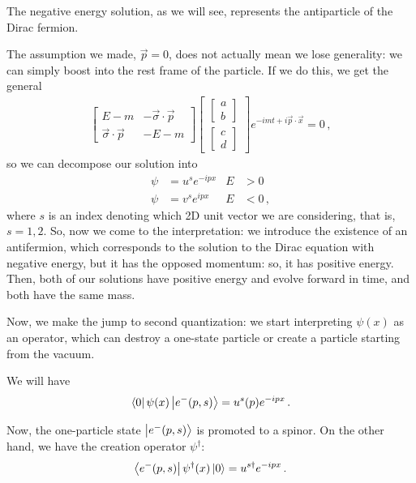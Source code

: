 \documentclass[main.tex]{subfiles}
\begin{document}
The negative energy solution, as we will see, represents the antiparticle of the Dirac fermion.

The assumption we made, \(\vec{p} = 0\), does not actually mean we lose generality: we can simply boost into the rest frame of the particle.
If we do this, we get the general 
%
\begin{subequations}
\begin{align}
\left[\begin{array}{cc}
E-m & - \vec{\sigma} \cdot \vec{p} \\ 
\vec{\sigma} \cdot \vec{p} & -E-m
\end{array}\right]
\left[\begin{array}{c}
\left[\begin{array}{c}
a \\ 
b
\end{array}\right] \\ 
\left[\begin{array}{c}
c \\ 
d
\end{array}\right]
\end{array}\right]
e^{-imt + i \vec{p} \cdot \vec{x}}
= 0
\,,
\end{align}
\end{subequations}
%
so we can decompose our solution into 
%
\begin{align}
\psi &= u^{s} e^{-i p  x} & E&>0 \\
\psi &= v^{s} e^{i p x} & E&<0
\,,
\end{align}
%
where \(s\) is an index denoting which 2D unit vector we are considering, that is, \(s = 1, 2\). 
So, now we come to the interpretation: we introduce the existence of an antifermion, which corresponds to the solution to the Dirac equation with negative energy, but it has the opposed momentum: so, it has positive energy.
Then, both of our solutions have positive energy and evolve forward in time, and both have the same mass. 

Now, we make the jump to second quantization: we start interpreting \(\psi (x) \) as an operator, which can destroy a one-state particle or create a particle starting from the vacuum. 

We will have 
%
\begin{align}
\bra{0} \psi (x) \ket{e^{-}(p,s)} = u^{s} (p) e^{-ipx}
\,.
\end{align}

Now, the one-particle state \(\ket{e^{-}(p, s)}\) is promoted to a spinor. 
On the other hand, we have the creation operator \(\psi ^\dag\): 
%
\begin{align}
\bra{e^{-}(p,s)} \psi ^\dag (x) \ket{0} = u^{s\dag} e^{-ipx}
\,.
\end{align}
\end{document}
